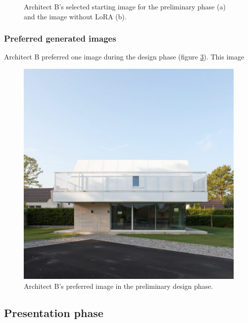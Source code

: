 \begin{figure}[H]
\begin{subfigure}[b]{0.3\textwidth}
        \caption{}
        \label{B-preliminary-selected-b}
    \end{subfigure}
    \caption{Architect B's selected starting image for the preliminary phase (a) and the image without LoRA (b).}
    \label{fig:B-preliminary-selected}
\end{figure}
\subsubsection{Preferred generated images}
Architect B preferred one image during the design phase (figure \ref{fig:B-preliminary-preferred}). This image 
\begin{figure}[H]
    \centering
    \includegraphics[width=0.3\linewidth]{Images/Results/Architect B/2. Preliminary phase/Met_lora_00005_.png}
    \caption{Architect B's preferred image in the preliminary design phase.}
    \label{fig:B-preliminary-preferred}
\end{figure}
\subsection{Presentation phase}
